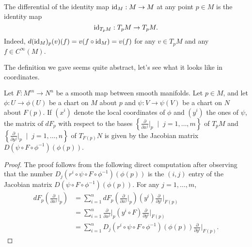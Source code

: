 \begin{rmk}
    The differential of the identity map $\operatorname{id}_M:M\to M$ at any point $p\in M$ is the identity map
    \begin{equation}
        \operatorname{id}_{T_pM}: T_pM \to T_pM.
    \end{equation}
    Indeed, $d (\operatorname{id}_M)_p(v)(f) = v(f\circ\operatorname{id}_M) = v(f)$ for any $v\in T_pM$ and any $f\in C^\infty(M)$.
\end{rmk}

The definition we gave seems quite abstract, let's see what it looks like in coordinates.

\begin{prop}\label{prop:DiffCoords}
    Let $F:M^m\to N^n$ be a smooth map between smooth manifolds.
    Let $p\in M$, and let $\phi : U \to \phi(U)$ be a chart on $M$ about $p$ and $\psi: V \to \psi(V)$ be a chart on $N$ about $F(p)$.
    If $(x^i)$ denote the local coordinates of $\phi$ and $(y^i)$ the ones of $\psi$, the matrix of $dF_p$ with respect to the bases $\left\{\frac{\partial}{\partial x^j}\big|_p \;\mid\; j=1,\ldots,m\right\}$ of $T_pM$ and $\left\{\frac{\partial}{\partial y^j}\big|_p \;\mid\; j=1,\ldots,n\right\}$ of $T_{F(p)}N$ is given by the Jacobian matrix $D(\psi\circ F \circ\phi^{-1})(\phi(p))$.
\end{prop}
\begin{proof}
    The proof follows from the following direct computation after observing that the number $D_j(r^i \circ \psi \circ F \circ \phi^{-1})(\phi(p))$ is the $(i,j)$ entry of the Jacobian matrix $D(\psi\circ F \circ\phi^{-1})(\phi(p))$. For any $j=1,\ldots,m$,
    \begin{align}
        dF_p \left(\frac{\partial}{\partial x^j}\Big|_p\right)
        &= \sum_{i=1}^n dF_p \left(\frac{\partial}{\partial x^j}\Big|_p\right) (y^i) \frac{\partial}{\partial y^i}\Big|_{F(p)} \\
        &= \sum_{i=1}^n \frac{\partial}{\partial x^j}\Big|_p (y^i \circ F) \frac{\partial}{\partial y^i}\Big|_{F(p)} \\
        &=\sum_{i=1}^n D_j(r^i \circ \psi \circ F \circ \phi^{-1})(\phi(p)) \frac{\partial}{\partial y^i}\Big|_{F(p)}.
    \end{align}
\end{proof}

